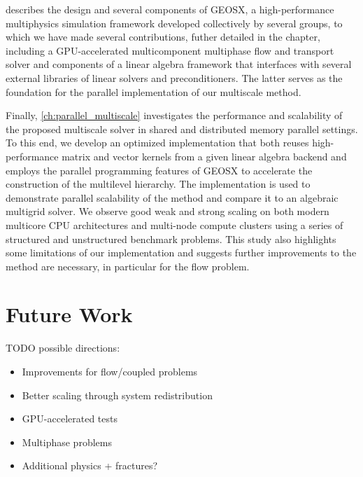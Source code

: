  describes the design and several components of GEOSX, a high-performance multiphysics simulation framework developed collectively by several groups, to which we have made several contributions, futher detailed in the chapter, including a GPU-accelerated multicomponent multiphase flow and transport solver and components of a linear algebra framework that interfaces with several external libraries of linear solvers and preconditioners.   The latter serves as the foundation for the parallel implementation of our multiscale method.

Finally, \cref{ch:parallel_multiscale} investigates the performance and scalability of the proposed multiscale solver in shared and distributed memory parallel settings.   To this end, we develop an optimized implementation that both reuses high-performance matrix and vector kernels from a given linear algebra backend and employs the parallel programming features of GEOSX to accelerate the construction of the multilevel hierarchy.   The implementation is used to demonstrate parallel scalability of the method and compare it to an algebraic multigrid solver.   We observe good weak and strong scaling on both modern multicore CPU architectures and multi-node compute clusters using a series of structured and unstructured benchmark problems.   This study also highlights some limitations of our implementation and suggests further improvements to the method are necessary, in particular for the flow problem.

\section{Future Work}

TODO possible directions:
\begin{itemize}
  \item Improvements for flow/coupled problems
  \item Better scaling through system redistribution
  \item GPU-accelerated tests
  \item Multiphase problems
  \item Additional physics + fractures?
\end{itemize}
